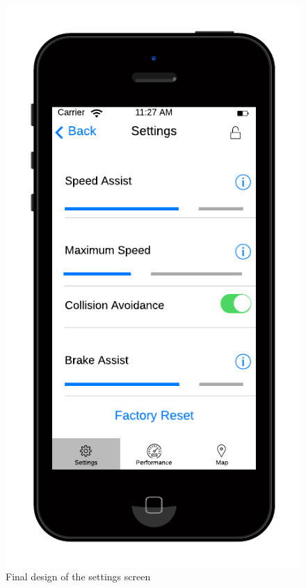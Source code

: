 \documentclass[a4paper]{report}
\begin{document}
{\begin{figure}[h]
\includegraphics[scale=0.6]{figures/final_design/settings}
\caption{Final design of the settings screen}
\end{figure}
\begin{figure}[H]
\centering

\end{figure}}
\end{document}
